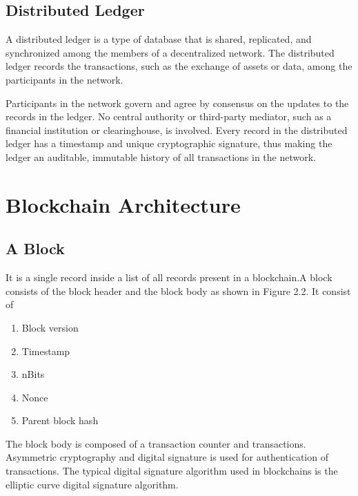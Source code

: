 \documentclass[12pt]{report}
\begin{document}
\section{Distributed Ledger}
\par A distributed ledger is a type of database that is shared, replicated, and synchronized among the members of a decentralized network. The distributed ledger records the transactions, such as the exchange of assets or data, among the participants in the network.
\newline
\par Participants in the network govern and agree by consensus on the updates to the records in the ledger. No central authority or third-party mediator, such as a financial institution or clearinghouse, is involved. Every record in the distributed ledger has a timestamp and unique cryptographic signature, thus making the ledger an auditable, immutable history of all transactions in the network.
\newpage
\chapter{Blockchain Architecture}
\section{A Block}
\par It is a single record inside a list of all records present in a blockchain.A block consists of the block header and the block body as shown in Figure 2.2. It consist of 

\begin{enumerate}
    \item Block version
    \item Timestamp
    \item nBits
    \item Nonce
    \item Parent block hash
\end{enumerate}
\par The block body is composed of a transaction counter and transactions. Asymmetric cryptography and digital signature is used for authentication of transactions. The typical digital signature algorithm used in blockchains is the elliptic curve digital signature algorithm.
\end{document}
